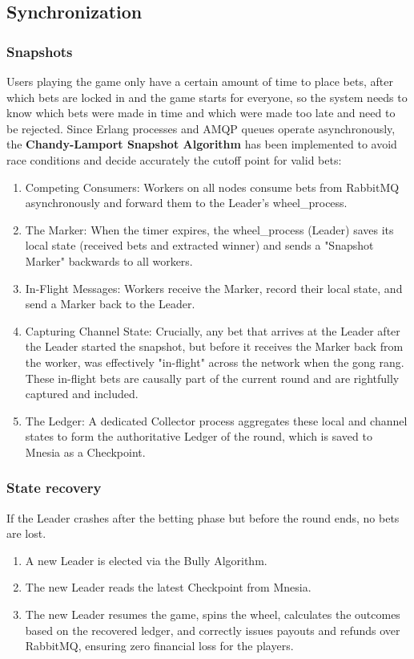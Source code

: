 \documentclass[12pt,a4paper]{article}
\begin{document}
\subsection{Synchronization}

\subsubsection{Snapshots}
Users playing the game only have a certain amount of time to place bets, after which bets are locked in and the game starts for everyone, so the system needs to know which bets were made in time and which were made too late and need to be rejected. Since Erlang processes and AMQP queues operate asynchronously, the \textbf{Chandy-Lamport Snapshot Algorithm} has been implemented to avoid race conditions and decide accurately the cutoff point for valid bets:
\begin{enumerate}
    \item Competing Consumers: Workers on all nodes consume bets from RabbitMQ asynchronously and forward them to the Leader's wheel\_process.
    \item The Marker: When the timer expires, the wheel\_process (Leader) saves its local state (received bets and extracted winner) and sends a "Snapshot Marker" backwards to all workers.
    \item In-Flight Messages: Workers receive the Marker, record their local state, and send a Marker back to the Leader.
    \item Capturing Channel State: Crucially, any bet that arrives at the Leader after the Leader started the snapshot, but before it receives the Marker back from the worker, was effectively "in-flight" across the network when the gong rang. These in-flight bets are causally part of the current round and are rightfully captured and included.
    \item The Ledger: A dedicated Collector process aggregates these local and channel states to form the authoritative Ledger of the round, which is saved to Mnesia as a Checkpoint.
\end{enumerate}

\subsubsection{State recovery}
If the Leader crashes after the betting phase but before the round ends, no bets are lost.
\begin{enumerate}
    \item A new Leader is elected via the Bully Algorithm.
    \item The new Leader reads the latest Checkpoint from Mnesia.
    \item The new Leader resumes the game, spins the wheel, calculates the outcomes based on the recovered ledger, and correctly issues payouts and refunds over RabbitMQ, ensuring zero financial loss for the players.
\end{enumerate}
\end{document}
